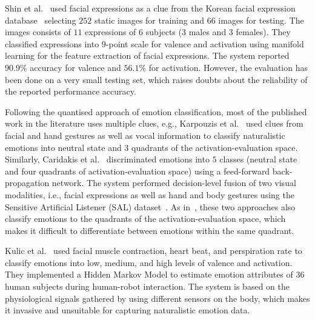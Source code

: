 \documentclass[10pt,journal,cspaper,compsoc]{IEEEtran}
\begin{document}

Shin et al.~\cite{shin2007facial} used facial expressions as a clue from the Korean facial expression database~\cite{bahn1997facial} selecting $252$ static images for training and $66$ images for testing. The images consists of $11$ expressions of $6$ subjects ($3$ males and $3$ females). They classified expressions into $9$-point scale for valence and activation using manifold learning for the feature extraction of facial expressions. The system reported $90.9\%$ accuracy for valence and $56.1\%$ for activation. However, the evaluation has been done on a very small testing set, which raises doubts about the reliability of the reported performance accuracy.

Following the quantised approach of emotion classification, most of the published work in the literature uses multiple clues, e.g., Karpouzis et al.~\cite{karpouzis2007modeling} used clues from facial and hand gestures as well as vocal information to classify naturalistic emotions into neutral state and $3$ quadrants of the activation-evaluation space. Similarly, Caridakis et al.~\cite{Caridakis2008} discriminated emotions into $5$ classes (neutral state and four quadrants of activation-evaluation space) using a feed-forward back-propagation network. The system performed decision-level fusion of two visual modalities, i.e., facial expressions as well as hand and body gestures using the Sensitive Artificial Listener (SAL) dataset~\cite{douglas2008sensitive}. As in~\cite{Ioannou05}, these two approaches also classify emotions to the quadrants of the activation-evaluation space, which makes it difficult to differentiate between emotions
within the same quadrant.

Kulic et al.~\cite{kulic2007affective} used facial muscle contraction, heart beat, and perspiration rate to classify emotions into low, medium, and high levels of valence and activation. They implemented a Hidden Markov Model to estimate emotion attributes of $36$ human subjects during human-robot interaction. The system is based on the physiological signals gathered by using different sensors on the body, which makes it invasive and unsuitable for capturing naturalistic emotion data.

\end{document}
